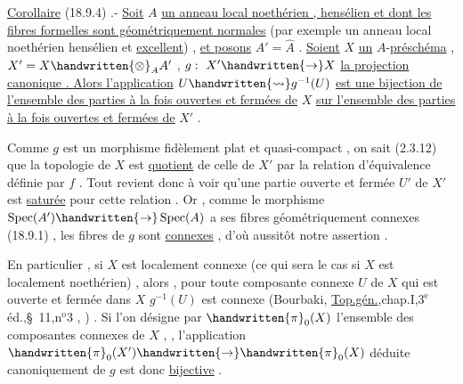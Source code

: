 
\uline{Corollaire} (18.9.4) .- \uline{Soit} $A$ \uline{un anneau local noethérien , hensélien et dont les fibres formelles sont géométriquement normales}  (par exemple un anneau local noethérien hensélien et \uline{excellent}) , \uline{et posons} $A'=\hat A$ . \uline{Soient} $X$ \uline{un} $A$-\uline{préschéma} , $X'=X\handwritten{\otimes}_A A'$ , $g:\ X'\handwritten{\to} X$ \uline{la projection canonique . Alors l'application} $U\handwritten{\rightsquigarrow} g^{-1}(U)$ \uline{est une bijection de l'ensemble des parties à la fois ouvertes et fermées de} $X$ \uline{sur l'ensemble des parties à la fois ouvertes et fermées de} $X'$ .

Comme $g$ est un morphisme  fidèlement plat et quasi-compact , on sait (2.3.12) que la topologie de $X$ est \uline{quotient} de celle de $X'$ par la relation d'équivalence définie par $f$ . Tout revient donc à voir  qu'une partie ouverte et fermée $U'$ de $X'$ est \uline{saturée} pour cette relation . Or , comme le morphisme $\operatorname{Spec}(A')\handwritten{\to}\operatorname{Spec}(A)$  a ses fibres géométriquement connexes (18.9.1) , les fibres de $g$ sont \uline{connexes} , d'où aussitôt notre assertion .

En particulier , si $X$ est localement connexe (ce qui sera le cas si $X$ est localement noethérien) , alors , pour toute  composante connexe $U$ de $X$ \handwritten{(} qui est ouverte et fermée dans $X$ \handwritten{),} $g^{-1}(U)$ est connexe (Bourbaki, \uline{Top.gén.},chap.I,$3^{\mathrm e}$ éd.,\S\ 11,n$^{\mathrm o}$3 , ) . Si l'on désigne par $\handwritten{\pi}_0(X)$ l'ensemble des composantes connexes de $X$ , , l'application $\handwritten{\pi}_0(X')\handwritten{\to}\handwritten{\pi}_0(X)$ déduite canoniquement de $g$ est donc \uline{bijective} .





